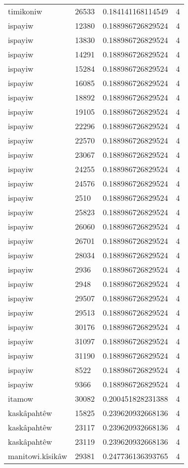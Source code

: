 \begin{longtable}{llll}
timikoniw & 26533 & 0.184141168114549 & 4 \\
ispayiw & 12380 & 0.188986726829524 & 4 \\
ispayiw & 13830 & 0.188986726829524 & 4 \\
ispayiw & 14291 & 0.188986726829524 & 4 \\
ispayiw & 15284 & 0.188986726829524 & 4 \\
ispayiw & 16085 & 0.188986726829524 & 4 \\
ispayiw & 18892 & 0.188986726829524 & 4 \\
ispayiw & 19105 & 0.188986726829524 & 4 \\
ispayiw & 22296 & 0.188986726829524 & 4 \\
ispayiw & 22570 & 0.188986726829524 & 4 \\
ispayiw & 23067 & 0.188986726829524 & 4 \\
ispayiw & 24255 & 0.188986726829524 & 4 \\
ispayiw & 24576 & 0.188986726829524 & 4 \\
ispayiw & 2510 & 0.188986726829524 & 4 \\
ispayiw & 25823 & 0.188986726829524 & 4 \\
ispayiw & 26060 & 0.188986726829524 & 4 \\
ispayiw & 26701 & 0.188986726829524 & 4 \\
ispayiw & 28034 & 0.188986726829524 & 4 \\
ispayiw & 2936 & 0.188986726829524 & 4 \\
ispayiw & 2948 & 0.188986726829524 & 4 \\
ispayiw & 29507 & 0.188986726829524 & 4 \\
ispayiw & 29513 & 0.188986726829524 & 4 \\
ispayiw & 30176 & 0.188986726829524 & 4 \\
ispayiw & 31097 & 0.188986726829524 & 4 \\
ispayiw & 31190 & 0.188986726829524 & 4 \\
ispayiw & 8522 & 0.188986726829524 & 4 \\
ispayiw & 9366 & 0.188986726829524 & 4 \\
itamow & 30082 & 0.200451828231388 & 4 \\
kaskâpahtêw & 15825 & 0.239620932668136 & 4 \\
kaskâpahtêw & 23117 & 0.239620932668136 & 4 \\
kaskâpahtêw & 23119 & 0.239620932668136 & 4 \\
manitowi.kîsikâw & 29381 & 0.247736136393765 & 4 \\

\end{longtable}
